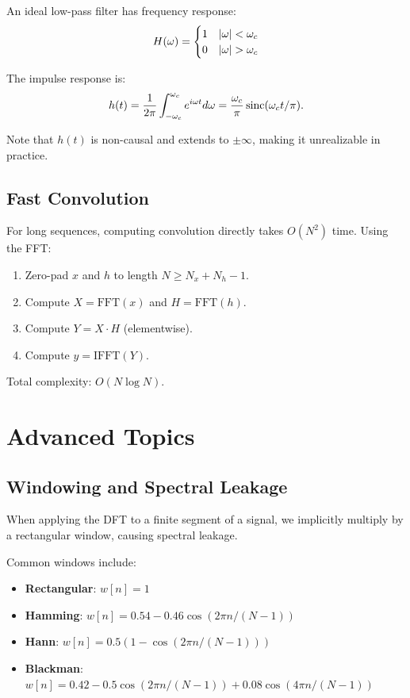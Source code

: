 \begin{notechapter}
\begin{example}
An ideal low-pass filter has frequency response:
\[
H(\omega) = \begin{cases}
1 & \left|\omega\right| < \omega_c \\
0 & \left|\omega\right| > \omega_c
\end{cases}
\]

The impulse response is:
\[
h(t) = \frac{1}{2\pi} \int_{-\omega_c}^{\omega_c} e^{i\omega t} d\omega = \frac{\omega_c}{\pi} \operatorname{sinc}(\omega_c t/\pi).
\]

Note that $h(t)$ is non-causal and extends to $\pm \infty$, making it unrealizable in practice.
\end{example}

\subsection{Fast Convolution}

For long sequences, computing convolution directly takes $O(N^2)$ time. Using the FFT:
\begin{enumerate}
\item Zero-pad $x$ and $h$ to length $N \geq N_x + N_h - 1$.
\item Compute $X = \text{FFT}(x)$ and $H = \text{FFT}(h)$.
\item Compute $Y = X \cdot H$ (elementwise).
\item Compute $y = \text{IFFT}(Y)$.
\end{enumerate}

Total complexity: $O(N \log N)$.

\section{Advanced Topics}

\subsection{Windowing and Spectral Leakage}

When applying the DFT to a finite segment of a signal, we implicitly multiply by a rectangular window, causing spectral leakage.

\begin{definition}
Common windows include:
\begin{itemize}
\item \textbf{Rectangular}: $w[n] = 1$
\item \textbf{Hamming}: $w[n] = 0.54 - 0.46\cos(2\pi n/(N-1))$
\item \textbf{Hann}: $w[n] = 0.5(1 - \cos(2\pi n/(N-1)))$
\item \textbf{Blackman}: $w[n] = 0.42 - 0.5\cos(2\pi n/(N-1)) + 0.08\cos(4\pi n/(N-1))$
\end{itemize}
\end{definition}


\end{notechapter}
